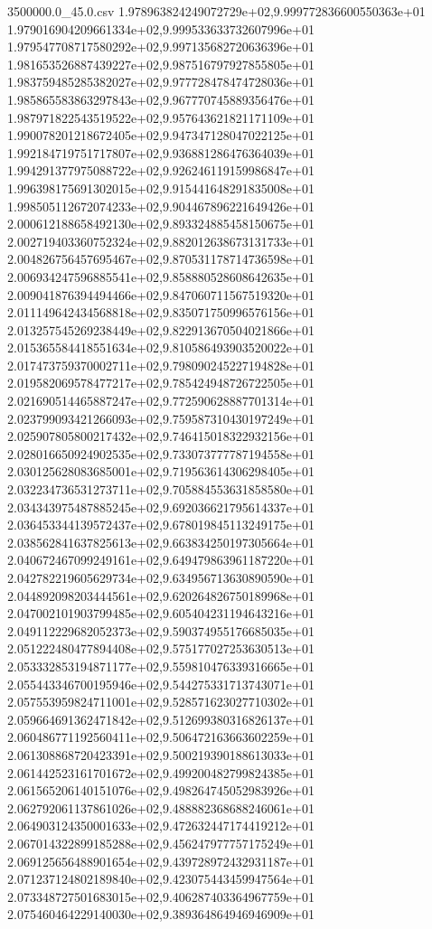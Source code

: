\begin{filecontents*}{3500000.0_45.0.csv}
1.978963824249072729e+02,9.999772836600550363e+01
1.979016904209661334e+02,9.999533633732607996e+01
1.979547708717580292e+02,9.997135682720636396e+01
1.981653526887439227e+02,9.987516797927855805e+01
1.983759485285382027e+02,9.977728478474728036e+01
1.985865583863297843e+02,9.967770745889356476e+01
1.987971822543519522e+02,9.957643621821171109e+01
1.990078201218672405e+02,9.947347128047022125e+01
1.992184719751717807e+02,9.936881286476364039e+01
1.994291377975088722e+02,9.926246119159986847e+01
1.996398175691302015e+02,9.915441648291835008e+01
1.998505112672074233e+02,9.904467896221649426e+01
2.000612188658492130e+02,9.893324885458150675e+01
2.002719403360752324e+02,9.882012638673131733e+01
2.004826756457695467e+02,9.870531178714736598e+01
2.006934247596885541e+02,9.858880528608642635e+01
2.009041876394494466e+02,9.847060711567519320e+01
2.011149642434568818e+02,9.835071750996576156e+01
2.013257545269238449e+02,9.822913670504021866e+01
2.015365584418551634e+02,9.810586493903520022e+01
2.017473759370002711e+02,9.798090245227194828e+01
2.019582069578477217e+02,9.785424948726722505e+01
2.021690514465887247e+02,9.772590628887701314e+01
2.023799093421266093e+02,9.759587310430197249e+01
2.025907805800217432e+02,9.746415018322932156e+01
2.028016650924902535e+02,9.733073777787194558e+01
2.030125628083685001e+02,9.719563614306298405e+01
2.032234736531273711e+02,9.705884553631858580e+01
2.034343975487885245e+02,9.692036621795614337e+01
2.036453344139572437e+02,9.678019845113249175e+01
2.038562841637825613e+02,9.663834250197305664e+01
2.040672467099249161e+02,9.649479863961187220e+01
2.042782219605629734e+02,9.634956713630890590e+01
2.044892098203444561e+02,9.620264826750189968e+01
2.047002101903799485e+02,9.605404231194643216e+01
2.049112229682052373e+02,9.590374955176685035e+01
2.051222480477894408e+02,9.575177027253630513e+01
2.053332853194871177e+02,9.559810476339316665e+01
2.055443346700195946e+02,9.544275331713743071e+01
2.057553959824711001e+02,9.528571623027710302e+01
2.059664691362471842e+02,9.512699380316826137e+01
2.060486771192560411e+02,9.506472163663602259e+01
2.061308868720423391e+02,9.500219390188613033e+01
2.061442523161701672e+02,9.499200482799824385e+01
2.061565206140151076e+02,9.498264745052983926e+01
2.062792061137861026e+02,9.488882368688246061e+01
2.064903124350001633e+02,9.472632447174419212e+01
2.067014322899185288e+02,9.456247977757175249e+01
2.069125656488901654e+02,9.439728972432931187e+01
2.071237124802189840e+02,9.423075443459947564e+01
2.073348727501683015e+02,9.406287403364967759e+01
2.075460464229140030e+02,9.389364864946946909e+01

\end{filecontents*}
